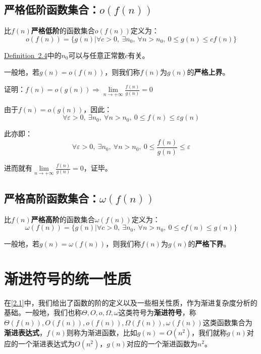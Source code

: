 \documentclass[12pt,a4paper,violet]{bbe}
\begin{document}
\subsection{严格低阶函数集合：$o(f(n))$}
\begin{definition}\label{def2.4}
	比$f(n)$\textbf{严格低阶}的函数集合$o(f(n))$定义为：
	$$
	o(f(n))=\{g(n)|\forall c>0,~\exists n_0,~\forall n>n_0,~0\leqslant g(n)\leqslant cf(n)\}
	$$
\end{definition}
\begin{remark}
	\hyperref[def2.4]{Definition~2.4}中的$n_0$可以与任意正常数$c$有关。
\end{remark}
一般地，若$g(n)=o(f(n))$，则我们称$f(n)$为$g(n)$的\textbf{严格上界}。
\begin{example}
	证明：$f(n)=o(g(n))\Rightarrow\displaystyle \lim\limits_{n\to +\infty}\frac{f(n)}{g(n)}=0$

\end{example}
\begin{solution}
由于$f(n)=o(g(n))$，因此：
$$
\forall \varepsilon>0,~\exists n_0,~\forall n>n_0,~0\leqslant f(n)\leqslant \varepsilon g(n)
$$

此亦即：
$$
\forall \varepsilon>0,~\exists n_0,~\forall n>n_0,~0\leqslant \frac{f(n)}{g(n)}\leqslant \varepsilon
$$

进而就有$\lim\limits_{n\to +\infty}\frac{f(n)}{g(n)}=0$，证毕。
\end{solution}
\subsection{严格高阶函数集合：$\omega(f(n))$}
\begin{definition}
	比$f(n)$\textbf{严格高阶}的函数集合$\omega(f(n))$定义为：
	$$
	\omega(f(n))=\{g(n)|\forall c>0,~\exists n_0,~\forall n>n_0,~0\leqslant cf(n)\leqslant g(n)\}
	$$
\end{definition}

一般地，若$g(n)=\omega(f(n))$，则我们称$f(n)$为$g(n)$的\textbf{严格下界}。
\section{渐进符号的统一性质}
在\cref{2.1}中，我们给出了函数的阶的定义以及一些相关性质，作为渐进复杂度分析的基础。一般地，我们也称$\Theta,O,o,\Omega,\omega$这类符号为\textbf{渐进符号}，称$\Theta(f(n)),O(f(n)),o(f(n)),\Omega(f(n)),\omega(f(n))$这类函数集合为\textbf{渐进表达式}，$f(n)$则称为渐进函数，比如$g(n)=O(n^2)$，我们就称$g(n)$对应的一个渐进表达式为$O(n^2)$，$g(n)$对应的一个渐进函数为$n^2$。
\end{document}
